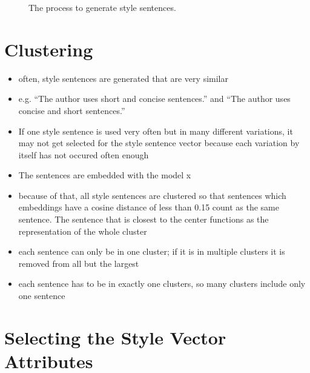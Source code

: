 \begin{figure}[ht]
  
  \caption{The process to generate style sentences.}
  \label{fig:style_sentence_generation}
\end{figure}


\section{Clustering}
\label{sec:approach:clustering}

\begin{itemize}
  \item often, style sentences are generated that are very similar
  \item e.g. \enquote{The author uses short and concise sentences.} and \enquote{The author uses concise and short sentences.}
  \item If one style sentence is used very often but in many different variations, it may not get selected for the style sentence vector because each variation by itself has not occured often enough
  \item The sentences are embedded with the model x %
  \item because of that, all style sentences are clustered so that sentences which embeddings have a cosine distance of less than 0.15 count as the same sentence. The sentence that is closest to the center functions as the representation of the whole cluster
  \item each sentence can only be in one cluster; if it is in multiple clusters it is removed from all but the largest
  \item each sentence has to be in exactly one clusters, so many clusters include only one sentence
\end{itemize}


\section{Selecting the Style Vector Attributes}
\label{sec:approach:selection}

